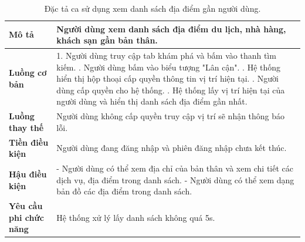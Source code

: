 \begin{longtable}{| p{4cm} | p{\dimexpr\linewidth-4cm-4\tabcolsep} |} %
    \caption{Đặc tả ca sử dụng xem danh sách địa điểm gần người dùng.} %
    \label{tab:uc_nearby_places_spec} \\ %

    \hline
    \textbf{Mô tả} & Người dùng xem danh sách địa điểm du lịch, nhà hàng, khách sạn gần bản thân. \\
    \hline
    \endfirsthead %



    \hline %
    \endlastfoot

    \textbf{Luồng cơ bản} & 1. Người dùng truy cập tab khám phá và bấm vào thanh tìm kiếm. \newline
                           2. Người dùng bấm vào biểu tượng "Lân cận". \newline
                           3. Hệ thống hiển thị hộp thoại cấp quyền thông tin vị trí hiện tại. \newline
                           4. Người dùng cấp quyền cho hệ thống. \newline
                           5. Hệ thống lấy vị trí hiện tại của người dùng và hiển thị danh sách địa điểm gần nhất. \\
    \hline
    \textbf{Luồng thay thế} & Người dùng không cấp quyền truy cập vị trí sẽ nhận thông báo lỗi. \\
    \hline
    \textbf{Tiền điều kiện} & Người dùng đang đăng nhập và phiên đăng nhập chưa kết thúc. \\
    \hline
    \textbf{Hậu điều kiện} & - Người dùng có thể xem địa chỉ của bản thân và xem chi tiết các dịch vụ, địa điểm trong danh sách. \newline
                           - Người dùng có thể xem dạng bản đồ các địa điểm trong danh sách. \\
    \hline
    \textbf{Yêu cầu phi chức năng} & Hệ thống xử lý lấy danh sách không quá 5s. \\

\end{longtable}
\vspace{0.8cm}

